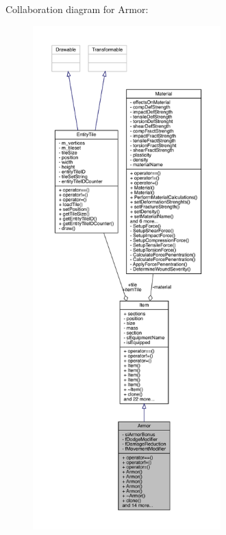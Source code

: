 Collaboration diagram for Armor\+:
\nopagebreak
\begin{figure}[H]
\begin{center}
\leavevmode
\includegraphics[height=550pt]{class_armor__coll__graph}
\end{center}
\end{figure}
